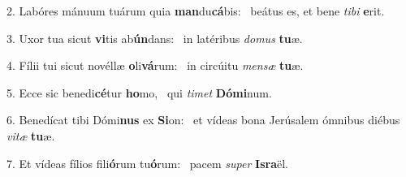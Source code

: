 2. Labóres mánuum tuárum quia \textbf{man}du\textbf{cá}bis: \ast\  beátus es, et bene \textit{ti}\textit{bi} \textbf{e}rit.\

3. Uxor tua sicut \textbf{vi}tis ab\textbf{ún}dans: \ast\  in latéribus \textit{do}\textit{mus} \textbf{tu}æ.\

4. Fílii tui sicut novéllæ \textbf{o}li\textbf{vá}rum: \ast\  in circúitu \textit{men}\textit{sæ} \textbf{tu}æ.\

5. Ecce sic benedi\textbf{cé}tur \textbf{ho}mo, \ast\  qui \textit{ti}\textit{met} \textbf{Dó}\textbf{mi}num.\

6. Benedícat tibi Dómi\textbf{nus} ex \textbf{Si}on: \ast\  et vídeas bona Jerúsalem ómnibus diébus \textit{vi}\textit{tæ} \textbf{tu}æ.\

7. Et vídeas fílios fili\textbf{ó}rum tu\textbf{ó}rum: \ast\  pacem \textit{su}\textit{per} \textbf{Is}\textbf{ra}ël.\

